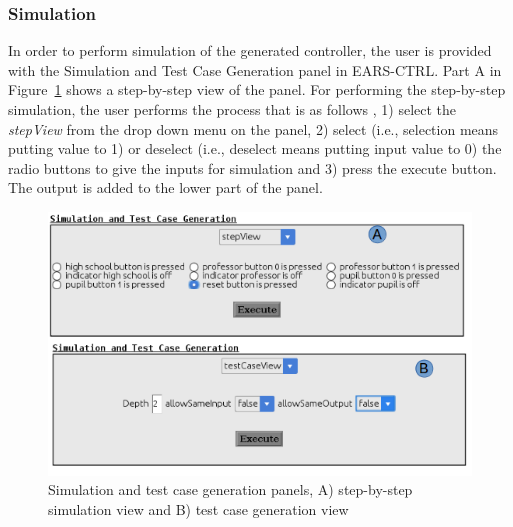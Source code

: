 \subsubsection{Simulation}
\vspace{-.2cm}
In order to perform simulation of the generated controller, the user is provided
with the \textsf{Simulation and Test Case Generation} panel in
\textsf{EARS-CTRL}. \textsf{Part A} in Figure~\ref{fig:PanelView} shows a
step-by-step view of the panel. For performing the step-by-step simulation, the
user performs the process that is as follows , 1) select the
\textsf{\emph{stepView}} from the drop down menu on the panel, 2) select (i.e.,
selection means putting value to 1) or deselect (i.e., deselect means putting input value to 0) the radio buttons to give the inputs for simulation and 3) press the execute button. The output is added to
the lower part of the  panel. 
\begin{figure}[!h]
\centering
\includegraphics[width=.9\textwidth]{./images/Two_Views_Panel.png}
\caption{Simulation and test case generation panels, A) step-by-step simulation
view and B) test case generation view}
\label{fig:PanelView}
\vspace{-.4cm}
\end{figure}
